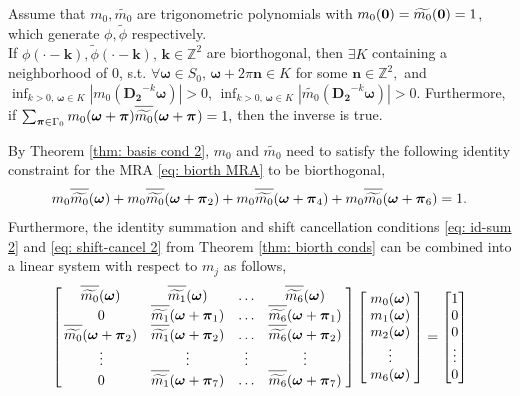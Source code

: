 \begin{thm}\label{thm: basis cond 2}
Assume that $m_0, \widetilde{m_0}$ are trigonometric polynomials with $m_0(\boldsymbol{0})=\widetilde{m_0}(\boldsymbol{0}) = 1$, which generate $\phi,\widetilde{\phi}$ respectively.\\
If $\phi(\cdot - \boldsymbol{k}),\widetilde{\phi}(\cdot - \boldsymbol{k}),\,\boldsymbol{k}\in\mathbb{Z}^2$ are biorthogonal, then $\exists K$ containing a neighborhood of 0, s.t. $\forall\boldsymbol{\omega}\in S_0,\,\boldsymbol{\omega}+2\pi\mathbf{n}\in K$ for some $\mathbf{n}\in\mathbb{Z}^2, $ and $\inf_{k>0,\,\boldsymbol{\omega}\in K}|m_0(\mathbf{D_2}^{-k}\boldsymbol{\omega})| >0$, $\inf_{k>0,\,\boldsymbol{\omega}\in K}|\widetilde{m_0}(\mathbf{D_2}^{-k}\boldsymbol{\omega})| >0$. 
 Furthermore, if  $\sum_{\boldsymbol{\V{\pi}}\in \Gamma_0} m_0(\boldsymbol{\omega}+\boldsymbol{\pi})\sbarmp{0}{} = 1,$ then the inverse is true.
\end{thm}
By Theorem \ref{thm: basis cond 2}, $m_0$ and $\widetilde{m_0}$ need to satisfy the following identity constraint for the MRA \eqref{eq: biorth MRA} to be biorthogonal,
\begin{align}\label{eq: identity-cond}
m_0\sbarm{0} + m_0\sbarmp{0}{2} + m_0\sbarmp{0}{4} + m_0\sbarmp{0}{6} = 1.
\end{align}
Furthermore, the identity summation and shift cancellation conditions \eqref{eq: id-sum 2} and \eqref{eq: shift-cancel 2} from Theorem \ref{thm: biorth conds}
 can be combined into a linear system with respect to $m_j$ as follows,
\begin{align}\label{eq: LS-new}
\begin{bmatrix}
    \,\sbarm{0} & \sbarm{1} & \hdots & \sbarm{6}\;  \\
    \;0 & \sbarmp{1}{1}  & \hdots  & \sbarmp{6}{1}\; \\
    \,\sbarmp{0}{2} & \sbarmp{1}{2} & \hdots & \sbarmp{6}{2}\;\\
    \;\vdots & \vdots & \vdots & \vdots \; \\
    \;0 & \sbarmp{1}{7} & \hdots & \sbarmp{6}{7}\;
\end{bmatrix}
\begin{bmatrix}
\;\mo{0}\; \\
\;\mo{1}\; \\
\;\mo{2}\; \\
\; \vdots\; \\
\;\mo{6}\; 
\end{bmatrix} 
=
\begin{bmatrix}
1\\
0\\
0\\
\vdots \\
0
\end{bmatrix}
\end{align}
